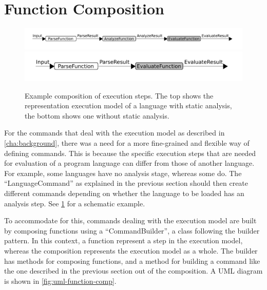 \makeatletter
\Gscale@div\imgscale\textwidth{\wd0}
\makeatother
%
\section{Function Composition}
\label{sec:function-comp}
\begin{figure}[t]
  \includegraphics[scale=\imgscale]{unit-flow}
  \includegraphics[scale=\imgscale]{unit-flow-no-analyze}
  \caption{Example composition of execution steps. The top shows the
    representation execution model of a language with static analysis,
    the bottom shows one without static analysis. }
  \label{fig:unit-flow}
\end{figure}

For the commands that deal with the execution model as described in
\cref{cha:background}, there was a need for a more fine-grained and
flexible way of defining commands. This is because the specific
execution steps that are needed for evaluation of a program language
can differ from those of another language. For example, some languages
have no analysis stage, whereas some do. The ``LanguageCommand'' as
explained in the previous section should then create different
commands depending on whether the language to be loaded has an
analysis step. See \cref{fig:unit-flow} for a schematic example.

To accommodate for this, commands dealing with the execution model are
built by composing functions using a ``CommandBuilder'', a class
following the builder pattern. In this context, a function represent a
step in the execution model, whereas the composition represents the
execution model as a whole. The builder has methods for composing
functions, and a method for building a command like the one described
in the previous section out of the composition. A UML diagram is shown
in \cref{fig:uml-function-comp}.

